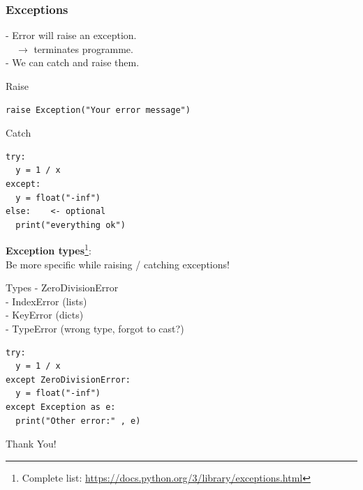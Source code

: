 \documentclass{beamer}
\begin{document}
\begin{frame}[fragile]
	\frametitle{Exceptions}
	- Error will raise an exception.\\
	~~$\rightarrow$ terminates programme.\\
	- We can catch and raise them.
	\begin{block}{Raise}
		\begin{verbatim}
raise Exception("Your error message")
		\end{verbatim}
	\end{block}
	\begin{block}{Catch}
\begin{verbatim}
try:
  y = 1 / x
except:
  y = float("-inf")
else:    <- optional
  print("everything ok")
\end{verbatim}	
	\end{block}
\end{frame}

\begin{frame}[fragile]
	\textbf{Exception types}\footnote{Complete list: \url{https://docs.python.org/3/library/exceptions.html}}:\\
	Be more specific while raising / catching exceptions! 
	\begin{exampleblock}{Types}
	- ZeroDivisionError\\
	- IndexError (lists)\\
	- KeyError (dicts)\\
	- TypeError (wrong type, forgot to cast?)
	\end{exampleblock}
	\begin{example}
\begin{verbatim}
try:
  y = 1 / x
except ZeroDivisionError:
  y = float("-inf")
except Exception as e:
  print("Other error:" , e)
\end{verbatim}
	\end{example}

\end{frame}

\begin{frame}[fragile]
\centering
\LARGE
Thank You!
	
\end{frame}
\end{document}
